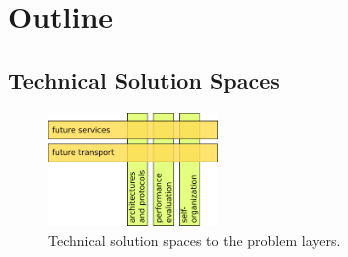 











\section{Outline}




\subsection{Technical Solution Spaces}


\begin{figure}
\centering
\includegraphics[width=0.4\textwidth]{images/expose/hv-topics-new.pdf}
\caption{Technical solution spaces to the problem layers.}
\label{fig:hv-topics}
\end{figure}

